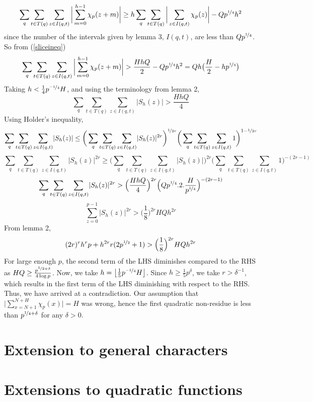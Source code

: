 \documentclass{report}
\begin{document}
$$\sum_q\sum\limits_{t\in T(q)}\sum\limits_{z\in I(q,t)}\bigg \lvert \sum\limits_{m=0}^{h-1}\chi_p(z+m) \bigg \rvert \geq h\sum_q\sum\limits_{t\in T(q)}\bigg \lvert \sum\limits_{z\in I(q,t)}\chi_p(z)\bigg \rvert-Qp^{\nicefrac{1}{4}}h^2$$
since the number of the intervals given by lemma 3, $I(q,t)$, are less than $Qp^{\nicefrac{1}{4}}$. So from (\ref{sliceineq})
$$\sum_q\sum\limits_{t\in T(q)}\sum\limits_{z\in I(q,t)}\bigg \lvert \sum\limits_{m=0}^{h-1}\chi_p(z+m) \bigg \rvert > \frac{HhQ}{2}-Qp^{\nicefrac{1}{4}} h^2=Qh\big(\frac{H}{2}-hp^{\nicefrac{1}{4}}\big)$$
Taking $h<\frac{1}{4}p^{\nicefrac{-1}{4}}H$, and using the terminology from lemma 2,
$$\sum_q\sum\limits_{t\in T(q)}\sum\limits_{z\in I(q,t)}\lvert S_h(z) \rvert > \frac{HhQ}{4}$$
Using Holder's inequality,
$$\sum_q\sum\limits_{t\in T(q)}\sum\limits_{z\in I(q,t)}\lvert S_h(z) \rvert \leq \bigg ( \sum_q\sum\limits_{t\in T(q)}\sum\limits_{z\in I(q,t)}\lvert S_h(z) \rvert^{2r} \bigg )^{\nicefrac{1}{2r}}\bigg ( \sum_q\sum\limits_{t\in T(q)}\sum\limits_{z\in I(q,t)}1 \bigg )^{1-\nicefrac{1}{2r}}$$
$$\sum_q\sum\limits_{t\in T(q)}\sum\limits_{z\in I(q,t)}\lvert S_h(z) \rvert^{2r} \geq \bigg ( \sum_q\sum\limits_{t\in T(q)}\sum\limits_{z\in I(q,t)}\lvert S_h(z) \rvert \bigg )^{2r} \bigg ( \sum_q\sum\limits_{t\in T(q)}\sum\limits_{z\in I(q,t)}1 \bigg )^{-(2r-1)}$$
$$\sum_q\sum\limits_{t\in T(q)}\sum\limits_{z\in I(q,t)}\lvert S_h(z) \rvert^{2r} > \Big( \frac{HhQ}{4}\Big)^{2r}\Big ( Qp^{\nicefrac{1}{4}}.2.\frac{H}{p^{\nicefrac{1}{4}}}\Big )^{-(2r-1)}$$
$$\sum\limits_{z=0}^{p-1}\lvert S_h(z) \rvert^{2r}>\Big(\frac{1}{8}\Big)^{2r}HQh^{2r}$$
From lemma 2,
$$(2r)^{r}h^{r}p+h^{2r}r(2p^{\nicefrac{1}{2}}+1)>\Big(\frac{1}{8}\Big)^{2r}HQh^{2r}$$
For large enough $p$, the second term of the LHS diminishes compared to the RHS as $HQ\geq \frac{p^{\nicefrac{1}{2}+\delta}}{4\log p}$. Now, we take $h=\left \lfloor \frac{1}{5}p^{\nicefrac{-1}{4}}H \right \rfloor$. Since $h \geq \frac{1}{5}p^{\delta}$, we take $r>\delta^{-1}$, which results in the first term of the LHS diminishing with respect to the RHS.
Thus, we have arrived at a contradiction. Our assumption that $\Big \lvert \sum\limits_{x=N+1}^{N+H}\chi_p(x)\Big \rvert=H$ was wrong, hence the first quadratic non-residue is less than $p^{\nicefrac{1}{4}+\delta}$ for any $\delta>0$.
%
%
\section{Extension to general characters}
%
%
\section{Extensions to quadratic functions}
%
%
\end{document}

